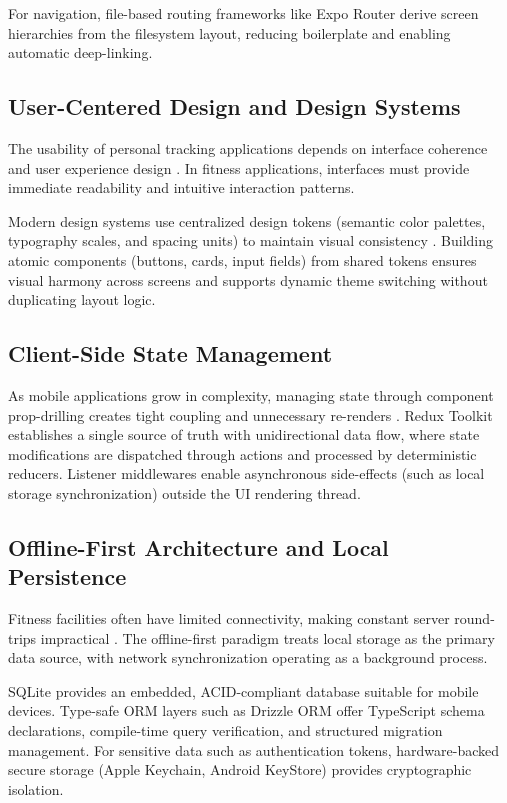 For navigation, file-based routing frameworks like Expo Router derive screen hierarchies from the filesystem layout, reducing boilerplate and enabling automatic deep-linking.

\subsection{User-Centered Design and Design Systems}
The usability of personal tracking applications depends on interface coherence and user experience design \citep{abras2004, nielsen1994}. In fitness applications, interfaces must provide immediate readability and intuitive interaction patterns.

Modern design systems use centralized design tokens (semantic color palettes, typography scales, and spacing units) to maintain visual consistency \citep{frain2022}. Building atomic components (buttons, cards, input fields) from shared tokens ensures visual harmony across screens and supports dynamic theme switching without duplicating layout logic.

\subsection{Client-Side State Management}
As mobile applications grow in complexity, managing state through component prop-drilling creates tight coupling and unnecessary re-renders \citep{banks2020learning}. Redux Toolkit establishes a single source of truth with unidirectional data flow, where state modifications are dispatched through actions and processed by deterministic reducers. Listener middlewares enable asynchronous side-effects (such as local storage synchronization) outside the UI rendering thread.

\subsection{Offline-First Architecture and Local Persistence}
Fitness facilities often have limited connectivity, making constant server round-trips impractical \citep{kleppmann2017}. The offline-first paradigm treats local storage as the primary data source, with network synchronization operating as a background process.

SQLite provides an embedded, ACID-compliant database suitable for mobile devices. Type-safe ORM layers such as Drizzle ORM offer TypeScript schema declarations, compile-time query verification, and structured migration management. For sensitive data such as authentication tokens, hardware-backed secure storage (Apple Keychain, Android KeyStore) provides cryptographic isolation.

